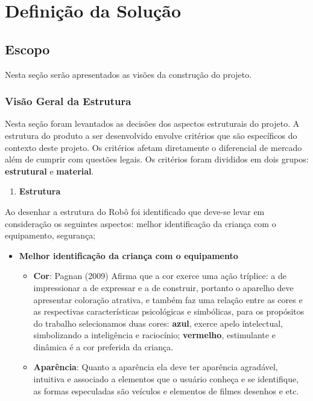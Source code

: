 \section{Definição da Solução}

\subsection{Escopo}
Nesta seção serão apresentados as visões da construção do projeto.

\subsubsection{Visão Geral da Estrutura}
Nesta seção foram levantados as decisões dos aspectos estruturais do projeto. A estrutura do produto a ser desenvolvido envolve critérios que são específicos do contexto deste projeto. Os critérios afetam diretamente o diferencial de mercado além de cumprir com questões legais. Os critérios foram divididos em dois grupos: \textbf{estrutural} e \textbf{material}.

\begin{enumerate}
  \item \textbf{Estrutura} 
\end{enumerate}

Ao desenhar a estrutura do Robô foi identificado que deve-se levar em consideração os seguintes aspectos: melhor identificação da criança com o equipamento, segurança;

\begin{itemize}
  \item \textbf{Melhor identificação da criança com o equipamento}
  \begin{itemize}
    \item \textbf{Cor}: Pagnan (2009) Afirma que a cor exerce uma ação tríplice: a de impressionar a de expressar e a de construir, portanto o aparelho deve apresentar coloração atrativa,  e também faz uma relação entre as cores e as respectivas características psicológicas e simbólicas, para os propósitos do trabalho selecionamos duas cores: \textbf{azul}, exerce apelo intelectual, simbolizando a inteligência e raciocínio; \textbf{vermelho}, estimulante e dinâmica é a cor preferida da criança.
    \item \textbf{Aparência}: Quanto a aparência ela deve ter aparência agradável, intuitiva e associado a elementos que o usuário conheça e se identifique, as formas especuladas são veículos e elementos de filmes desenhos e etc.
  \end{itemize}
\end{itemize}

